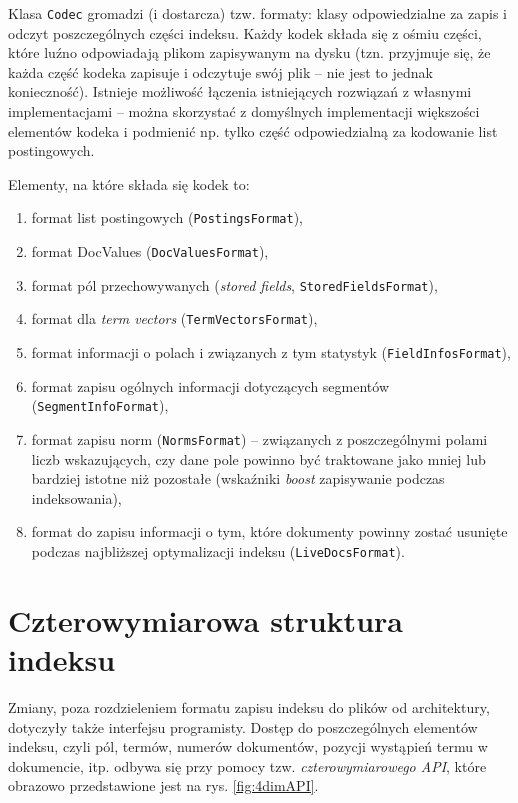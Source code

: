 Klasa \texttt{Codec} gromadzi (i dostarcza) tzw. formaty: klasy odpowiedzialne za zapis i odczyt poszczególnych części indeksu. Każdy kodek składa się z ośmiu części, które luźno odpowiadają plikom zapisywanym na dysku (tzn. przyjmuje się, że każda część kodeka zapisuje i odczytuje swój plik -- nie jest to jednak konieczność). Istnieje możliwość łączenia istniejących rozwiązań z własnymi implementacjami -- można skorzystać z domyślnych implementacji większości elementów kodeka i podmienić np. tylko część odpowiedzialną za kodowanie list postingowych.

Elementy, na które składa się kodek to:
\begin{enumerate}
 \item format list postingowych (\texttt{PostingsFormat}),
 \item format DocValues (\texttt{DocValuesFormat}),
 \item format pól przechowywanych (\emph{stored fields}, \texttt{StoredFieldsFormat}),
 \item format dla \emph{term vectors} (\texttt{TermVectorsFormat}),
 \item format informacji o polach i związanych z tym statystyk (\texttt{FieldInfosFormat}),
 \item format zapisu ogólnych informacji dotyczących segmentów (\texttt{SegmentInfoFormat}),
 \item format zapisu norm (\texttt{NormsFormat}) -- związanych z poszczególnymi polami liczb wskazujących, czy dane pole powinno być traktowane jako mniej lub bardziej istotne niż pozostałe (wskaźniki \emph{boost} zapisywanie podczas indeksowania),
 \item format do zapisu informacji o tym, które dokumenty powinny zostać usunięte podczas najbliższej optymalizacji indeksu (\texttt{LiveDocsFormat}).
\end{enumerate}

\section{Czterowymiarowa struktura indeksu}

Zmiany, poza rozdzieleniem formatu zapisu indeksu do plików od architektury, dotyczyły także interfejsu programisty. Dostęp do poszczególnych elementów indeksu, czyli pól, termów, numerów dokumentów, pozycji wystąpień termu w dokumencie, itp. odbywa się przy pomocy tzw. \emph{czterowymiarowego API}, które obrazowo przedstawione jest na rys. \ref{fig:4dimAPI}.

